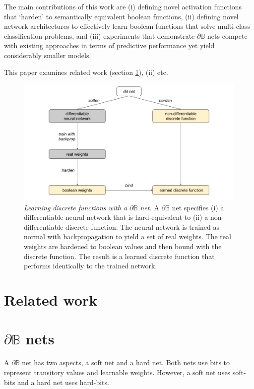 \documentclass{article} %
\begin{document}
The main contributions of this work are (i) defining novel activation functions that `harden' to semantically equivalent boolean functions, (ii) defining novel network architectures to effectively learn boolean functions that solve multi-class classification problems, and (iii) experiments that demonstrate $\partial \mathbb{B}$ nets compete with existing approaches in terms of predictive performance yet yield considerably smaller models.

This paper examines related work (section \ref{sec:related-work}), (ii) etc.

\begin{figure}[h]
	\centering
	\includegraphics[width=1.0\textwidth]{db-net.png}
	\caption{{\em Learning discrete functions with a $\partial\mathbb{B}$ net.} A $\partial \mathbb{B}$ net specifies (i) a differentiable neural network that is hard-equivalent to (ii) a non-differentiable discrete function. The neural network is trained as normal with backpropagation to yield a set of real weights. The real weights are hardened to boolean values and then bound with the discrete function. The result is a learned discrete function that performs identically to the trained network.}
	\label{fig:main-idea}
\end{figure}


\section{Related work}\label{sec:related-work}

\section{$\partial\mathbb{B}$ nets}

A $\partial \mathbb{B}$ net has two aspects, a soft net and a hard net. Both nets use bits to represent transitory values and learnable weights. However, a soft net uses soft-bits and a hard net uses hard-bits.
\end{document}

